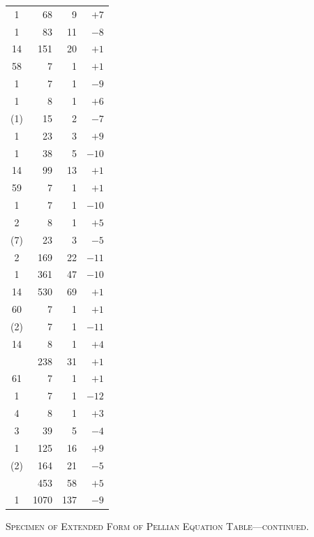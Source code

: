 \documentclass[11pt]{article}
\begin{document}
\begin{center}
\begin{tabular}{|c|r|r|r|}
1 & 68 & 9 & $+7$ \\
1 & 83 & 11 & $-8$ \\
14 & 151 & 20 & $+1$ \\
\hline
58 & 7 & 1 & $+1$ \\
1 & 7 & 1 & $-9$ \\
1 & 8 & 1 & $+6$ \\
(1) & 15 & 2 & $-7$ \\
1 & 23 & 3 & $+9$ \\
1 & 38 & 5 & $-10$ \\
14 & 99 & 13 & $+1$ \\
\hline
59 & 7 & 1 & $+1$ \\
1 & 7 & 1 & $-10$ \\
2 & 8 & 1 & $+5$ \\
(7) & 23 & 3 & $-5$ \\
2 & 169 & 22 & $-11$ \\
1 & 361 & 47 & $-10$ \\
14 & 530 & 69 & $+1$ \\
\hline
60 & 7 & 1 & $+1$ \\
(2) & 7 & 1 & $-11$ \\
14 & 8 & 1 & $+4$ \\
 & 238 & 31 & $+1$ \\
\hline
61 & 7 & 1 & $+1$ \\
1 & 7 & 1 & $-12$ \\
4 & 8 & 1 & $+3$ \\
3 & 39 & 5 & $-4$ \\
1 & 125 & 16 & $+9$ \\
(2) & 164 & 21 & $-5$ \\
 & 453 & 58 & $+5$ \\
1 & 1070 & 137 & $-9$ \\
\hline
\end{tabular}
\end{center}
\begin{center}
\small\textsc{Specimen of Extended Form of Pellian Equation Table---continued.}
\end{center}
\end{document}
